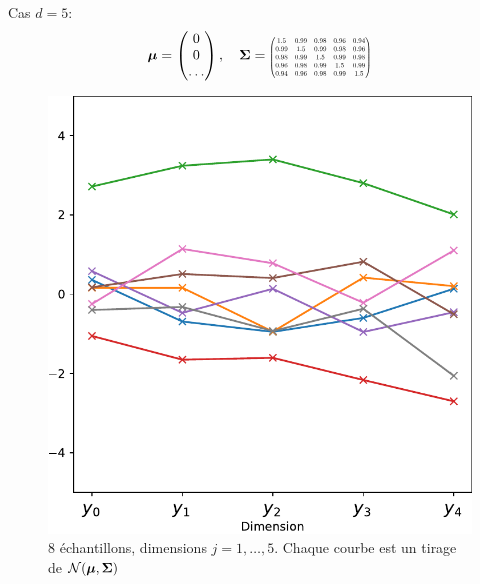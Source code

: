 \documentclass[xcolor=svgnames, t]{beamer}
\newcommand{\vectorx}[1]{\boldsymbol{\MakeLowercase{\mathbf{#1}}}}
\newcommand{\matrixx}[1]{\boldsymbol{\MakeUppercase{#1}}}
\newcommand{\scalemath}[2]{\scalebox{#1}{\mbox{\ensuremath{\displaystyle #2}}}}
\begin{document}
\begin{frame}{\subsecname}
  Cas $d=5$:
  \begin{equation*}
    \vectorx{\mu}
    =
    \begin{pmatrix}
      0 \\
      0 \\
      \dots
    \end{pmatrix},
    \quad
    \matrixx{\Sigma}
    =
    \scalemath{0.5}{
      \begin{pmatrix}
        1.5 & 0.99 & 0.98 & 0.96 & 0.94 \\
        0.99 & 1.5 & 0.99 & 0.98 & 0.96 \\
        0.98 & 0.99 & 1.5 & 0.99 & 0.98 \\
        0.96 & 0.98 & 0.99 & 1.5 & 0.99 \\
        0.94 & 0.96 & 0.98 & 0.99 & 1.5
        \end{pmatrix}
    }
  \end{equation*}
  \begin{figure}[ht]
    \includegraphics[scale=0.4]{gaussian_5d_valuevsindex.pdf}
    \caption{$8$ échantillons, dimensions $j=1, \dots, 5$.
    Chaque courbe est un tirage de $\mathcal{N}(\vectorx{\mu} , \matrixx{\Sigma})$
    }
  \end{figure}
\end{frame}
\end{document}
